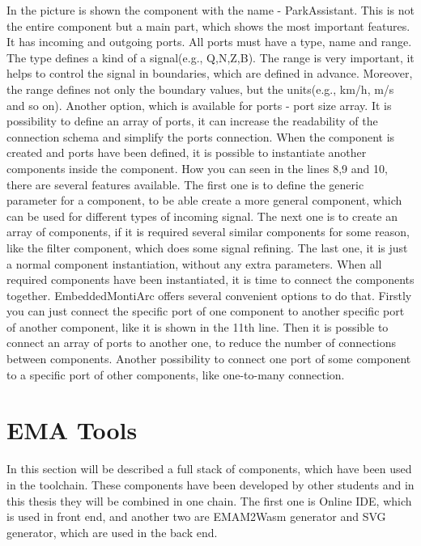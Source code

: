 In the picture is shown the component with the name - ParkAssistant. This is not the entire component but a main part, which shows the most important features. It has incoming and outgoing ports. All ports must have a type, name and range. The type defines a kind of a signal(e.g., Q,N,Z,B). The range is very important, it helps to control the signal in boundaries, which are defined in advance. Moreover, the range defines not only the boundary values, but the units(e.g., km/h, m/s and so on). Another option, which is available for ports - port size array. It is possibility to define an array of ports, it can increase the readability of the connection schema and simplify the ports connection. When the component is created and ports have been defined, it is possible to instantiate another components inside the component. How you can seen in the lines 8,9 and 10, there are several features available. The first one is to define the generic parameter for a component, to be able create a more general component, which can be used for different types of incoming signal. The next one is to create an array of components, if it is required several similar components for some reason, like the filter component, which does some signal refining. The last one, it is just a normal component instantiation, without any extra parameters. When all required components have been instantiated, it is time to connect the components together. EmbeddedMontiArc offers several convenient options to do that. Firstly you can just connect the specific port of one component to another specific port of another component, like it is shown in the 11th line. Then it is possible to connect an array of ports to another one, to reduce the number of connections between components. Another possibility to connect one port of some component to a specific port of other components, like one-to-many connection. 

\section{EMA Tools} \label{sec:tools}
In this section will be described a full stack of components, which have been used in the toolchain. These components have been developed by other students and in this thesis they will be combined in one chain. The first one is Online IDE, which is used in front end, and another two are EMAM2Wasm generator and SVG generator, which are used in the back end.
